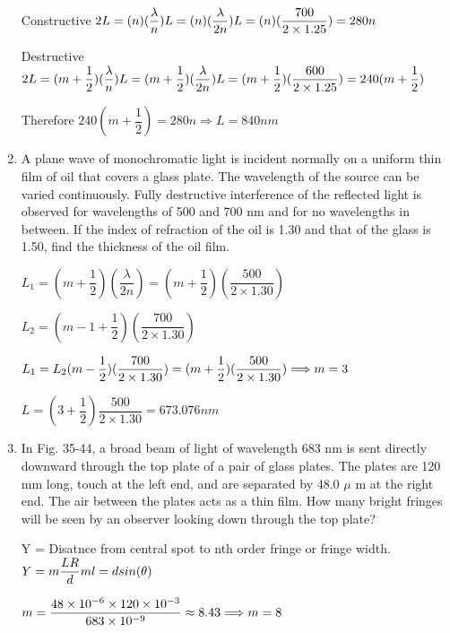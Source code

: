 \documentclass[fleqn]{article}
\begin{document}
\begin{enumerate}
    \textcolor{hwColor}{
      Constructive
      $
        2L=(n)(\dfrac{\lambda}{n}) \\
        L=(n)(\dfrac{\lambda}{2n}) \\
        L=(n)(\dfrac{700}{2\times 1.25})=280n \\
      $
    }

    \textcolor{hwColor}{
      Destructive
      $
        2L=(m+\dfrac{1}{2})(\dfrac{\lambda}{n}) \\
        L=(m+\dfrac{1}{2})(\dfrac{\lambda}{2n}) \\
        L=(m+\dfrac{1}{2})(\dfrac{600}{2 \times 1.25})=240(m+\dfrac{1}{2}) \\
      $
    }

    \textcolor{hwColor}{
      Therefore
      $
        240(m+\dfrac{1}{2})=280n \Longrightarrow L=840 nm
      $
    }

    \item A plane wave of monochromatic light is incident normally on a uniform thin film of oil that covers a glass plate. The wavelength of the source can be varied continuously. Fully destructive interference of the reflected light is observed for wavelengths of 500 and 700 nm and for no wavelengths in between. If the index of refraction of the oil is 1.30 and that of the glass is 1.50, find the thickness of the oil film.
    
    \textcolor{hwColor}{
      $
        L_1=(m+\dfrac{1}{2})(\dfrac{\lambda}{2n})=(m+\dfrac{1}{2})(\dfrac{500}{2 \times 1.30})
      $
    }

    \textcolor{hwColor}{
      $
        L_2=(m-1+\dfrac{1}{2})(\dfrac{700}{2 \times 1.30})
      $
    }

    \textcolor{hwColor}{
      $
        L_1=L_2 \\
        (m-\dfrac{1}{2})(\dfrac{700}{2 \times 1.30})=(m+\dfrac{1}{2})(\dfrac{500}{2 \times 1.30}) \\
        \Longrightarrow m=3
      $
    }

    \textcolor{hwColor}{
      $
        L=(3+\dfrac{1}{2})\dfrac{500}{2 \times 1.30}=673.076 nm
      $
    }

    \item In Fig. 35-44, a broad beam of light of wavelength 683 nm is sent directly downward through the top plate of a pair of glass plates. The plates are 120 mm long, touch at the left end, and are separated by 48.0 $\mu$ m at the right end. The air between the plates acts as a thin film. How many bright fringes will be seen by an observer looking down through the top plate?
    
    \textcolor{hwColor}{
      Y = Disatnce from central spot to nth order fringe or fringe width.
      $
        Y=m\dfrac{LR}{d} \\
        ml=dsin(\theta)
      $
    }

    \textcolor{hwColor}{
      $
        m=\dfrac{48 \times 10^{-6} \times 120 \times 10^{-3}}{683 \times 10^{-9}}\approx 8.43 \\
        \Longrightarrow m=8
      $
    }
    
  \end{enumerate}
\end{document}
